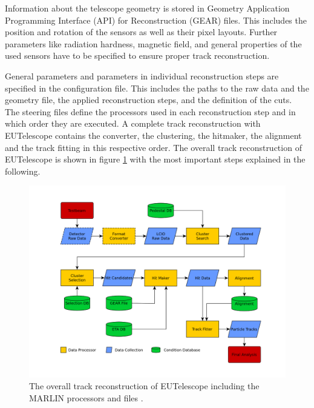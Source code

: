 Information about the telescope geometry is stored in Geometry  Application Programming Interface (API) for Reconstruction (GEAR) files. This includes the position and rotation
of the sensors as well as their pixel layouts. Further parameters like radiation hardness, magnetic field, and general properties of the used sensors have to be
specified to ensure proper track reconstruction.

General parameters and parameters in individual reconstruction steps are specified in the configuration file. This includes the paths to the raw data and the
geometry file, the applied reconstruction steps, and the definition of the cuts. \\
The steering files define the processors used in each reconstruction step and in which order they are executed.
A complete track reconstruction with EUTelescope contains the converter, the clustering, the hitmaker, the alignment and the track fitting in this respective order.
The overall track reconstruction of EUTelescope is shown in figure \ref{fig:track_reco} with the most important steps explained in the following.

\begin{figure}
  \hspace{-1.3cm}
  \includegraphics[height=0.85\textwidth]{images/track_reco.png}
  \caption{The overall track reconstruction of EUTelescope including the MARLIN processors and files \cite{track_reco}.}
  \label{fig:track_reco}
\end{figure}

